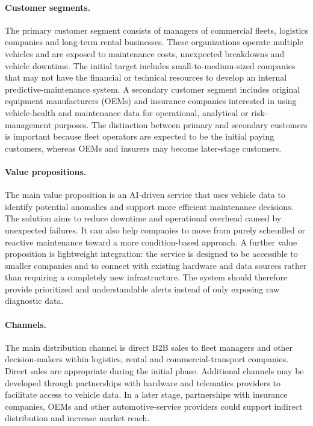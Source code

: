 \documentclass[11pt,a4paper]{article}
\begin{document}
\paragraph{Customer segments.}
The primary customer segment consists of managers of commercial fleets, logistics companies and long-term rental businesses. These organizations operate multiple vehicles and are exposed to maintenance costs, unexpected breakdowns and vehicle downtime. The initial target includes small-to-medium-sized companies that may not have the financial or technical resources to develop an internal predictive-maintenance system. A secondary customer segment includes original equipment manufacturers (OEMs) and insurance companies interested in using vehicle-health and maintenance data for operational, analytical or risk-management purposes. The distinction between primary and secondary customers is important because fleet operators are expected to be the initial paying customers, whereas OEMs and insurers may become later-stage customers.

\paragraph{Value propositions.}
The main value proposition is an AI-driven service that uses vehicle data to identify potential anomalies and support more efficient maintenance decisions. The solution aims to reduce downtime and operational overhead caused by unexpected failures. It can also help companies to move from purely scheudled or reactive maintenance toward a more condition-based approach. A further value proposition is lightweight integration: the service is designed to be accessible to smaller companies and to connect with existing hardware and data sources rather than requiring a completely new infrastructure. The system should therefore provide prioritized and understandable alerts instead of only exposing raw diagnostic data.

\paragraph{Channels.}
The main distribution channel is direct B2B sales to fleet managers and other decision-makers within logistics, rental and commercial-transport companies. Direct sales are appropriate during the initial phase. Additional channels may be developed through partnerships with hardware and telematics providers to facilitate access to vehicle data. In a later stage, partnerships with insurance companies, OEMs and other automotive-service providers could support indirect distribution and increase market reach.
\end{document}
